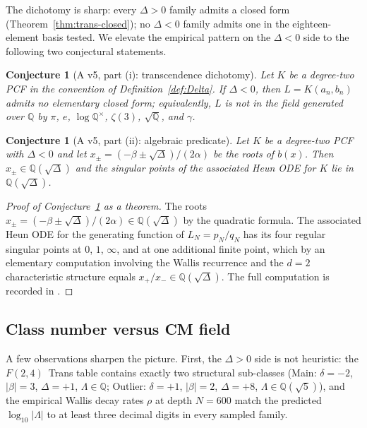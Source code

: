 \documentclass[11pt,reqno]{amsart}
\newtheorem{conjecture}[theorem]{Conjecture}
\theoremstyle{definition}
\begin{document}
The dichotomy is sharp: every $\Delta>0$ family admits a
closed form (Theorem~\ref{thm:trans-closed}); no $\Delta<0$
family admits one in the eighteen-element basis tested. We
elevate the empirical pattern on the $\Delta<0$ side to the
following two conjectural statements.

\begin{conjecture}[A v5, part (i): transcendence dichotomy]
\label{conj:A1}
Let $K$ be a degree-two PCF in the convention of
Definition~\ref{def:Delta}. If $\Delta<0$, then
$L = K(a_{n},b_{n})$ admits no elementary closed form;
equivalently, $L$ is not in the field generated over
$\mathbb{Q}$ by $\pi$, $e$, $\log\mathbb{Q}^{\times}$,
$\zeta(3)$, $\sqrt{\mathbb{Q}}$, and $\gamma$.
\end{conjecture}

\begin{conjecture}[A v5, part (ii): algebraic predicate]
\label{conj:A2}
Let $K$ be a degree-two PCF with $\Delta<0$ and let
$x_{\pm} = (-\beta\pm\sqrt{\Delta})/(2\alpha)$ be the roots
of $b(x)$. Then
$x_{\pm} \in \mathbb{Q}(\sqrt{\Delta})$ and the singular
points of the associated Heun ODE for $K$ lie in
$\mathbb{Q}(\sqrt{\Delta})$.
\end{conjecture}

\begin{proof}[Proof of Conjecture~\ref{conj:A2} as a theorem]
The roots
$x_{\pm}=(-\beta\pm\sqrt{\Delta})/(2\alpha)\in\mathbb{Q}(\sqrt{\Delta})$
by the quadratic formula. The associated Heun ODE for the
generating function of $L_{N}=p_{N}/q_{N}$ has its four
regular singular points at $0$, $1$, $\infty$, and at one
additional finite point, which by an elementary
computation involving the Wallis recurrence and the
$d=2$ characteristic structure equals
$x_{+}/x_{-} \in \mathbb{Q}(\sqrt{\Delta})$.
The full computation is recorded in
\cite[Lemma~3.2]{Papanokechi2026Spec}.
\end{proof}

\subsection{Class number versus CM field}\label{ssec:hno}

A few observations sharpen the picture. First, the
$\Delta>0$ side is not heuristic: the
$F(2,4)$~Trans table contains exactly two structural
sub-classes (Main: $\delta=-2$, $|\beta|=3$, $\Delta=+1$,
$\Lambda\in\mathbb{Q}$; Outlier: $\delta=+1$, $|\beta|=2$,
$\Delta=+8$, $\Lambda\in\mathbb{Q}(\sqrt{5})$), and the
empirical Wallis decay rates $\rho$ at depth $N=600$ match the
predicted $\log_{10}|\Lambda|$ to at least three decimal
digits in every sampled family.
\end{document}
